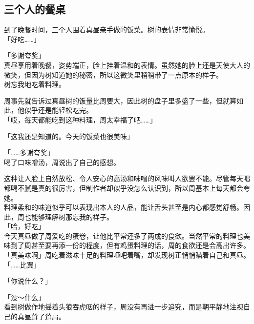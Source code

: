 \subsection{三个人的餐桌}

到了晚餐时间，三个人围着真昼亲手做的饭菜。树的表情非常愉悦。\\

「好吃……」

「多谢夸奖」\\

真昼享用着晚餐，姿势端正，脸上挂着温和的表情。虽然她的脸上还是天使大人的微笑，但因为树知道她的秘密，所以这微笑里稍稍带了一点原本的样子。\\

树忘我地吃着料理。

周事先就告诉过真昼树的饭量比周要大，因此树的盘子里多盛了一些，但就算如此，他似乎还是能轻松吃完。\\

「哎，每天都能吃到这种料理，周太幸福了吧……」

「这我还是知道的。今天的饭菜也很美味」

「……多谢夸奖」\\

喝了口味噌汤，周说出了自己的感想。

这种让人脸上自然放松、令人安心的高汤和味噌的风味叫人欲罢不能。尽管每天喝都喝不腻是真的很厉害，但制作者却似乎没怎么认识到，所以周基本上每天都会夸她。\\

料理柔和的味道似乎可以表现出本人的人品，能让舌头甚至是内心都感觉舒畅。因此，周也能够理解树那忘我的样子。\\

「哈，好吃」\\

今天真昼做了周爱吃的蛋卷，让他比平常还多了两成的食欲。当然平常的料理也美味到了周甚至要再添一份的程度，但有鸡蛋料理的话，周的食欲还是会高出许多。\\

「真美味啊」周吃着滋味十足的料理咂吧着嘴，却发现树正悄悄瞄着自己和真昼。\\

「……比翼」

「你说什么？」

「没～什么」\\

看到树做作地摇着头狼吞虎咽的样子，周没有再进一步追究，而是朝平静地注视自己的真昼耸了耸肩。\\

\vspace{2\baselineskip}

